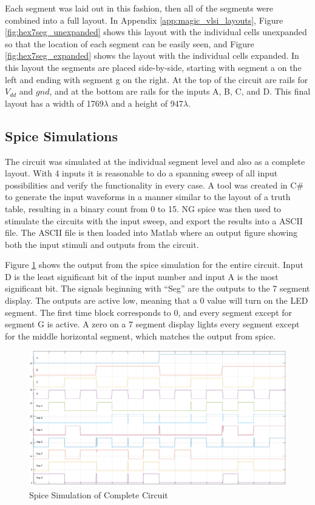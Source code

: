\documentclass[12pt]{article}
\begin{document}
Each segment was laid out in this fashion, then all of the segments were combined into a full layout.
In Appendix \ref{app:magic_vlsi_layouts}, Figure \ref{fig:hex7seg_unexpanded} shows this layout with the individual cells unexpanded so that the location of each segment can be easily seen, and Figure \ref{fig:hex7seg_expanded} shows the layout with the individual cells expanded.
In this layout the segments are placed side-by-side, starting with segment a on the left and ending with segment g on the right.
At the top of the circuit are rails for \(V_{dd}\) and \(gnd\), and at the bottom are rails for the inputs A, B, C, and D.
This final layout has a width of 1769\(\lambda\) and a height of 947\(\lambda\).



\subsection{Spice Simulations}
The circuit was simulated at the individual segment level and also as a complete layout.
With 4 inputs it is reasonable to do a spanning sweep of all input possibilities and verify the functionality in every case.
A tool was created in C\# to generate the input waveforms in a manner similar to the layout of a truth table, resulting in a binary count from 0 to 15.
NG spice was then used to stimulate the circuits with the input sweep, and export the results into a ASCII file.
The ASCII file is then loaded into Matlab where an output figure showing both the input stimuli and outputs from the circuit.

Figure \ref{fig:fullCktSpice} shows the output from the spice simulation for the entire circuit. 
Input D is the least significant bit of the input number and input A is the most significant bit.
The signals beginning with ``Seg'' are the outputs to the 7 segment display.
The outputs are active low, meaning that a 0 value will turn on the LED segment.
The first time block corresponds to 0, and every segment except for segment G is active. 
A zero on a 7 segment display lights every segment except for the middle horizontal segment, which matches the output from spice.



\begin{figure}[H]
	\centering
	\includegraphics[width=\textwidth, keepaspectratio]{Graphics/7seg.png}
	\caption{Spice Simulation of Complete Circuit}
	\label{fig:fullCktSpice}
\end{figure}
\end{document}
